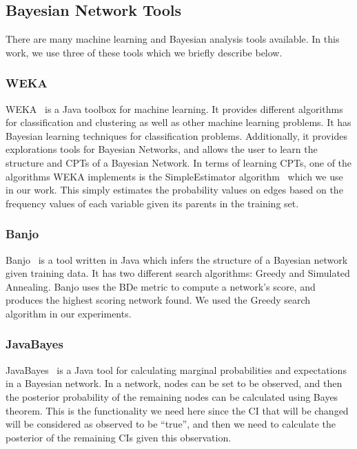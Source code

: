 \documentclass[10pt,twocolumn,letterpaper]{article}
\begin{document}
\subsection{Bayesian Network Tools}

There are many machine learning and Bayesian analysis tools available. In this work, we use three of these tools which we briefly describe
below.

\subsubsection{WEKA}

WEKA~\cite{hall2009weka} is a Java toolbox for machine learning. It provides different algorithms for classification and clustering as well as other machine
learning problems. It has Bayesian learning techniques for classification problems. Additionally, it provides explorations tools for Bayesian
Networks, and allows the user to learn the structure and CPTs of a Bayesian Network. In terms of learning CPTs, one of the algorithms WEKA implements is
the SimpleEstimator algorithm~\cite{witten2005data} which we use in our work. This simply estimates the probability values on edges based on
the frequency values of each variable given its parents in the training set.

\subsubsection{Banjo}
Banjo~\cite{banjotool} is a tool written in Java which infers the structure of a Bayesian network given training data. It has two different search algorithms:
Greedy and Simulated Annealing. Banjo uses the BDe metric to compute a network's score, and produces the highest scoring network found. We used the Greedy
search algorithm in our experiments.

\subsubsection{JavaBayes}

JavaBayes~\cite{javabayestool} is a Java tool for calculating marginal probabilities and expectations in a Bayesian network. In a network, nodes can be set to
be observed, and then
the posterior probability of the remaining nodes can be calculated using Bayes theorem. This is the functionality we need here since the CI that will be
changed will be considered as observed to be ``true'', and then we need to calculate the posterior of the remaining CIs given this observation.
\end{document}
